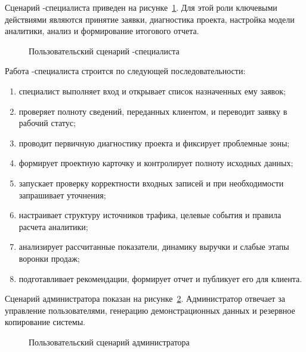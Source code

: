 Сценарий -специалиста приведен на рисунке~\ref{fig:test-user-guide-seo}. Для этой роли ключевыми действиями являются принятие заявки, диагностика проекта, настройка модели аналитики, анализ  и формирование итогового отчета.

\begin{figure}[H]
    \centering
    \caption{Пользовательский сценарий -специалиста}
    \label{fig:test-user-guide-seo}
\end{figure}

Работа -специалиста строится по следующей последовательности:
\begin{enumerate}
    \item специалист выполняет вход и открывает список назначенных ему заявок;
    \item проверяет полноту сведений, переданных клиентом, и переводит заявку в рабочий статус;
    \item проводит первичную диагностику  проекта и фиксирует проблемные зоны;
    \item формирует проектную карточку и контролирует полноту исходных данных;
    \item запускает проверку корректности входных записей и при необходимости запрашивает уточнения;
    \item настраивает структуру источников трафика, целевые события и правила расчета аналитики;
    \item анализирует рассчитанные показатели, динамику выручки и слабые этапы воронки продаж;
    \item подготавливает рекомендации, формирует отчет и публикует его для клиента.
\end{enumerate}

Сценарий администратора показан на рисунке~\ref{fig:test-user-guide-admin}. Администратор отвечает за управление пользователями, генерацию демонстрационных данных и резервное копирование системы.

\begin{figure}[H]
    \centering
    \caption{Пользовательский сценарий администратора}
    \label{fig:test-user-guide-admin}
\end{figure}

